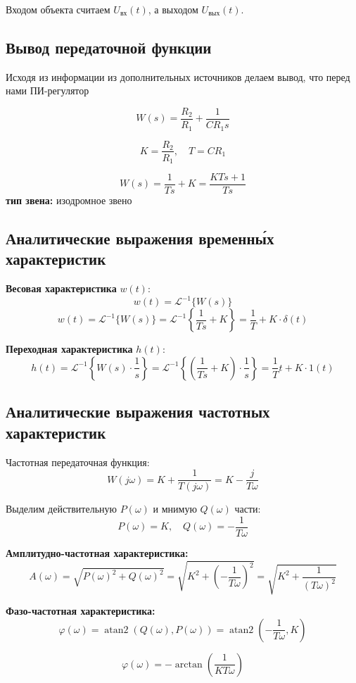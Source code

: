 \documentclass[a5paper, 10pt]{article}
\theoremstyle{definition}
\theoremstyle{plain}
\theoremstyle{remark}
\begin{document}
Входом объекта считаем $U_{\text{вх}}(t)$, а выходом $U_{\text{вых}}(t)$.

\subsection{Вывод передаточной функции}

Исходя из информации из дополнительных источников делаем вывод, что перед нами ПИ-регулятор

\[
W(s) =\dfrac{R_2}{R_1}+\frac{1}{CR_1s}
\]

\[
K = \frac{R_2}{R_1}, \quad T = CR_1 
\]

\[
W(s) = \frac{1}{Ts} + K = \frac{KTs + 1}{Ts}
\]
\textbf{тип звена:} изодромное звено
\subsection{Аналитические выражения временны́х характеристик}

\textbf{Весовая характеристика} $w(t)$:
\[
w(t) = \mathcal{L}^{-1}\{W(s)\}
\]
\[
w(t) =\mathcal{L}^{-1}\{W(s)\}= \mathcal{L}^{-1}\left\{\frac{1}{Ts} + K\right\} =\frac{1}{T} + K \cdot \delta(t)
\]

\vspace{5mm}
\textbf{Переходная характеристика} $h(t)$:
\[
h(t) = \mathcal{L}^{-1}\left\{W(s) \cdot \frac{1}{s}\right\} = \mathcal{L}^{-1}\left\{\left(\frac{1}{Ts} + K\right) \cdot \frac{1}{s}\right\} = \frac{1}{T}t + K \cdot 1(t)
\]


\subsection{Аналитические выражения частотных характеристик}
Частотная передаточная функция:
\[
W(j\omega) = K+ \frac{1}{T(j\omega)} = K - \frac{j}{T\omega}
\]

Выделим действительную $P(\omega)$ и мнимую $Q(\omega)$ части:
\[
P(\omega) = K, \quad Q(\omega) = -\frac{1}{T\omega}
\]

\textbf{Амплитудно-частотная характеристика:}
\[
A(\omega) = \sqrt{P(\omega)^2 + Q(\omega)^2} = \sqrt{K^2 + \left( -\frac{1}{T\omega} \right)^2} = \sqrt{K^2 + \frac{1}{(T\omega)^2}}
\]

\textbf{Фазо-частотная характеристика:}
\[
\varphi(\omega) = \operatorname{atan2}(Q(\omega), P(\omega)) = \operatorname{atan2}\left( -\frac{1}{T\omega}, K \right)
\]

\[
\varphi(\omega) = -\arctan\left(\frac{1}{KT\omega}\right)
\]
\end{document}
